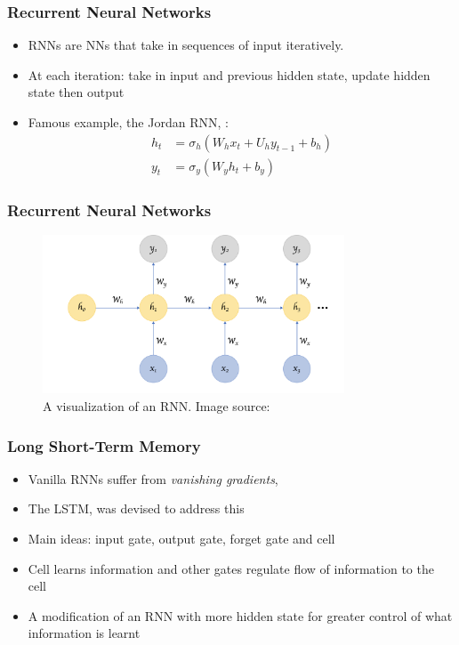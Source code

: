 \documentclass[handout]{beamer}
\begin{document}
\begin{frame}
    \frametitle{Recurrent Neural Networks}
     \begin{itemize}

         \item RNNs are NNs that take in sequences of input iteratively.
        \item At each iteration: take in input and previous hidden state, update hidden state then output
        \item Famous example, the Jordan RNN, {\color{blue}\cite{JORDAN1997}}:
            \begin{equation}
                \begin{aligned}
                    h_t &= \sigma_h(W_h x_t + U_h y_{t-1} + b_h)  \\
                    y_t &= \sigma_y(W_y h_t + b_y)
                \end{aligned}
            \end{equation}
    \end{itemize}
    
\end{frame}

\begin{frame}
    \frametitle{Recurrent Neural Networks}
\begin{figure}[htpb]
    \centering
    \includegraphics[width=0.8\textwidth]{./images/RNN.png}
    \caption{A visualization of an RNN. Image source: {\color{blue}\cite{RNNIMAGE2024}}}
\end{figure}
    
\end{frame}

\begin{frame}
    \frametitle{Long Short-Term Memory}
     \begin{itemize}
         \item Vanilla RNNs suffer from \textit{vanishing gradients}, {\color{blue}\cite{PASCANU2013}}
         \item The LSTM, {\color{blue}\cite{HOCHREITER1997}} was devised to address this
         \item Main ideas: input gate, output gate, forget gate and cell
        \item Cell learns information and other gates regulate flow of information to the cell
        \item A modification of an RNN with more hidden state for greater control of what information is learnt 
    \end{itemize}
\end{frame}
\end{document}
